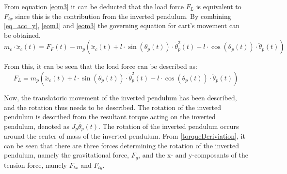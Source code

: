 From equation \autoref{eom3} it can be deducted that the load force $F_L$ is equivalent to $F_{tx}$ since this is the contribution from the inverted pendulum. By combining \autoref{eq_acc_y}, \ref{eom1} and \ref{eom3} the governing equation for cart's movement can be obtained.
\begin{equation}
m_c \cdot \ddot x_c(t) = F_{F}(t) - m_p\left(\ddot x_c(t) + l \cdot \sin(\theta_p(t))\cdot \dot\theta_p^2(t) - l \cdot \cos(\theta_p(t))\cdot \ddot\theta_p(t)\right)\label{eq:model_pen33}
\end{equation}

From this, it can be seen that the load force can be described as:
\begin{equation}
F_L = m_p\left(\ddot x_c(t) + l \cdot \sin(\theta_p(t))\cdot \dot\theta_p^2(t) - l \cdot \cos(\theta_p(t))\cdot \ddot\theta_p(t)\right)
\label{loadForce}
\end{equation}


Now, the translatoric movement of the inverted pendulum has been described, and the rotation thus needs to be described. The rotation of the inverted pendulum is described from the resultant torque acting on the inverted pendulum, denoted as $J_p \ddot{\theta_p}(t)$. The rotation of the inverted pendulum occurs around the center of mass of the inverted pendulum. From \autoref{torqueDeriviation}, it can be seen that there are three forces determining the rotation of the inverted pendulum, namely the gravitational force, $F_g$, and the x- and y-composants of the tension force, namely $F_{tx}$ and $F_{ty}$.

